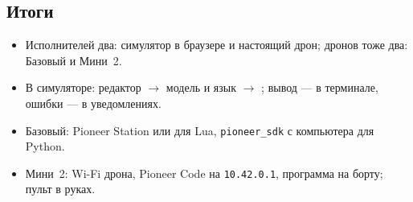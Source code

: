 \subsection*{Итоги}
\begin{itemize}
    \item Исполнителей два: симулятор в браузере и настоящий дрон; дронов тоже два: Базовый и Мини~2.
    \item В симуляторе: редактор $\to$ модель и язык $\to$ ; вывод --- в терминале, ошибки --- в уведомлениях.
    \item Базовый: Pioneer Station или  для Lua, \texttt{pioneer\_sdk} с компьютера для Python.
    \item Мини~2: Wi-Fi дрона, Pioneer Code на \texttt{10.42.0.1}, программа на борту; пульт в руках.
\end{itemize}
